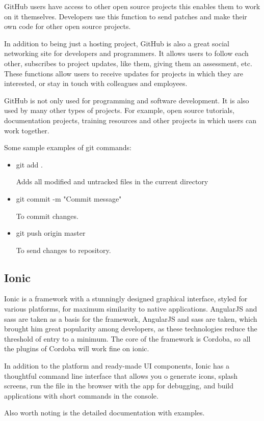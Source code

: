 GitHub users have access to other open source projects this enables them to work on it themselves. Developers use this function to send patches and make their own code for other open source projects.\par 

In addition to being just a hosting project, GitHub is also a great social networking site for developers and programmers. It allows users to follow each other, subscribes to project updates, like them, giving them an assessment, etc. These functions allow users to receive updates for projects in which they are interested, or stay in touch with colleagues and employees.\par

GitHub is not only used for programming and software development. It is also used by many other types of projects. For example, open source tutorials, documentation projects, training resources and other projects in which users can work together.\cite{GitHub}\par

Some sample examples of git commands:
\begin{itemize}

    \item git add .\par
    Adds all modified and untracked files in the current directory
    
    \item git commit -m "Commit message"\par
    To commit changes.
    
    \item git push origin master\par
    To send changes to repository. 
\end{itemize}

\subsection{Ionic}
Ionic is a framework with a stunningly designed graphical interface, styled for various platforms, for maximum similarity to native applications. AngularJS and sass are taken as a basis for the framework, AngularJS and sass are taken, which brought him great popularity among developers, as these technologies reduce the threshold of entry to a minimum. The core of the framework is Cordoba, so all the plugins of Cordoba will work fine on ionic.\par In addition to the platform and ready-made UI components, Ionic has a thoughtful command line interface that allows you o generate icons, splash screens, run the file in the browser with the app for debugging, and build applications with short commands in the console.\par Also worth noting is the detailed documentation with examples.\cite{Ionic}

